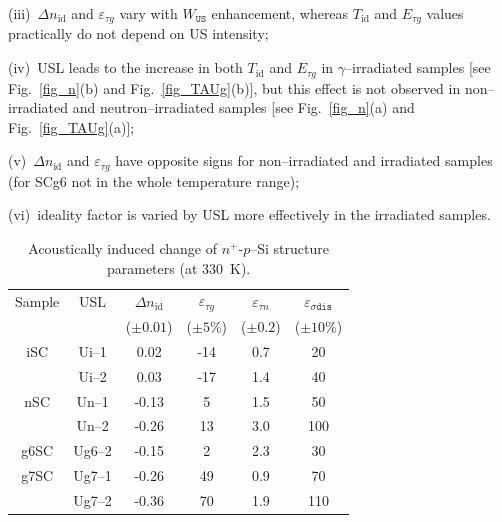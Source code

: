 \documentclass[aip,jap, amsmath,amssymb,reprint]{revtex4-1}
\begin{document}
\noindent
(iii)~$\Delta n_{\mathrm{id}}$ and $\varepsilon_{\tau g}$ vary with $W_{\mathtt{US}}$ enhancement, whereas $T_{\mathrm{id}}$ and $E_{\tau g}$ values practically do not depend on US intensity;

\noindent
(iv)~USL leads to the increase  in both $T_{\mathrm{id}}$ and $E_{\tau g}$ in $\gamma$--irradiated samples [see Fig.~\ref{fig_n}(b) and Fig.~\ref{fig_TAUg}(b)],
but this effect is not observed in non--irradiated and neutron--irradiated samples [see Fig.~\ref{fig_n}(a) and Fig.~\ref{fig_TAUg}(a)];


\noindent
(v)~$\Delta n_{\mathrm{id}}$ and $\varepsilon_{\tau g}$ have opposite signs for non--irradiated and irradiated samples
(for SCg6 not in the whole temperature range);

\noindent
(vi)~ideality factor is varied by USL more effectively in the irradiated samples.


\begin{table}
\caption{\label{tabAIchange}Acoustically induced change of $n^+$-$p$--Si structure parameters (at 330~K).
}
\begin{ruledtabular}
\begin{tabular}{cccccc}
Sample&USL&$\Delta n_{\mathrm{id}}$ &$\varepsilon_{\tau g}$ &$\varepsilon_{\tau n}$ &$\varepsilon_{\sigma\mathtt{dis}}$ \\
&&\mbox{($\pm0.01$)}&($\pm5$\%)&($\pm0.2$)&($\pm10$\%)\\
\hline
iSC&Ui--1&0.02&-14&0.7&20\\
&Ui--2&0.03&-17&1.4&40\\
nSC&Un--1&-0.13&5&1.5&50\\
&Un--2&-0.26&13&3.0&100\\
g6SC&Ug6--2&-0.15&2&2.3&30\\
g7SC&Ug7--1&-0.26&49&0.9&70\\
&Ug7--2&-0.36&70&1.9&110\\
\end{tabular}
\end{ruledtabular}
\end{table}
\end{document}
